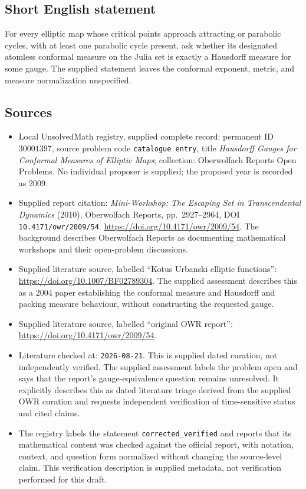 \documentclass[11pt]{article}
\begin{document}
\subsection{Short English statement}
For every elliptic map whose critical points approach attracting or parabolic cycles, with at least one parabolic cycle present, ask whether its designated atomless conformal measure on the Julia set is exactly a Hausdorff measure for some gauge. The supplied statement leaves the conformal exponent, metric, and measure normalization unspecified.
\subsection{Sources}
\begin{itemize}
\item Local UnsolvedMath registry, supplied complete record: permanent ID \(30001397\), source problem code \texttt{catalogue entry}, title \emph{Hausdorff Gauges for Conformal Measures of Elliptic Maps}; collection: Oberwolfach Reports Open Problems. No individual proposer is supplied; the proposed year is recorded as 2009.
\item Supplied report citation: \emph{Mini-Workshop: The Escaping Set in Transcendental Dynamics} (2010), Oberwolfach Reports, pp.\ 2927--2964, DOI \texttt{10.4171/owr/2009/54}. \url{https://doi.org/10.4171/owr/2009/54}. The background describes Oberwolfach Reports as documenting mathematical workshops and their open-problem discussions.
\item Supplied literature source, labelled ``Kotus Urbanski elliptic functions'': \url{https://doi.org/10.1007/BF02789304}. The supplied assessment describes this as a 2004 paper establishing the conformal measure and Hausdorff and packing measure behaviour, without constructing the requested gauge.
\item Supplied literature source, labelled ``original OWR report'': \url{https://doi.org/10.4171/owr/2009/54}.
\item Literature checked at: \texttt{2026-08-21}. This is supplied dated curation, not independently verified. The supplied assessment labels the problem open and says that the report's gauge-equivalence question remains unresolved. It explicitly describes this as dated literature triage derived from the supplied OWR curation and requests independent verification of time-sensitive status and cited claims.
\item The registry labels the statement \texttt{corrected\_verified} and reports that its mathematical content was checked against the official report, with notation, context, and question form normalized without changing the source-level claim. This verification description is supplied metadata, not verification performed for this draft.
\end{itemize}
\end{document}
